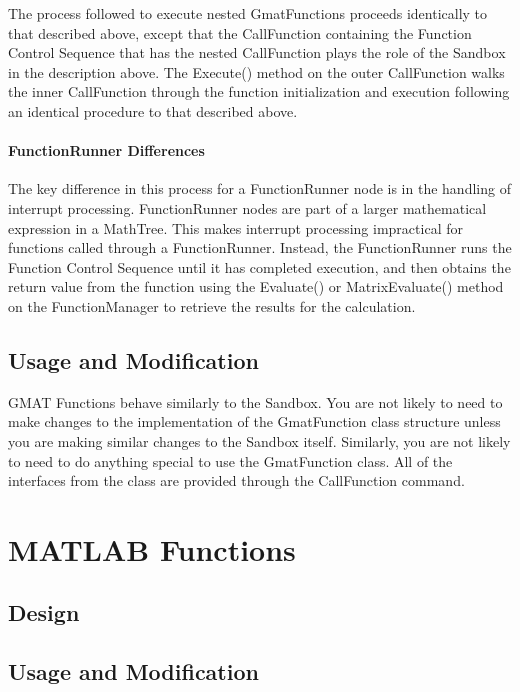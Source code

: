 The process followed to execute nested GmatFunctions proceeds identically to that described above,
except that the CallFunction containing the Function Control Sequence that has the nested
CallFunction plays the role of the Sandbox in the description above.  The Execute() method on the
outer CallFunction walks the inner CallFunction through the function initialization and execution
following an identical procedure to that described above.

\paragraph{FunctionRunner Differences}  The key difference in this process for a FunctionRunner
node is in the handling of interrupt processing.  FunctionRunner nodes are part of a larger
mathematical expression in a MathTree.  This makes interrupt processing impractical for functions
called through a FunctionRunner.  Instead, the FunctionRunner runs the Function Control Sequence
until it has completed execution, and then obtains the return value from the function using the
Evaluate() or MatrixEvaluate() method on the FunctionManager to retrieve the results for the
calculation.

\subsection{Usage and Modification}

GMAT Functions behave similarly to the Sandbox.  You are not likely to need to make changes to the
implementation of the GmatFunction class structure unless you are making similar changes to the
Sandbox itself.  Similarly, you are not likely to need to do anything special to use the
GmatFunction class.  All of the interfaces from the class are provided through the CallFunction
command.

\section{\label{section:MatlabFunctions}MATLAB Functions}

\subsection{Design}

\subsection{\label{section:MatlabFunctionFlow}Usage and Modification}

